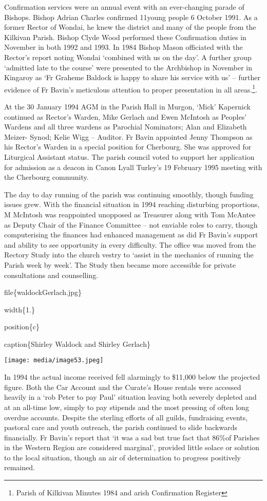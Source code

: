 Confirmation services were an annual event with an ever-changing parade of Bishops. Bishop Adrian Charles confirmed 11young people 6 October 1991. As a former Rector of Wondai, he knew the district and many of the people from the Kilkivan Parish. Bishop Clyde Wood performed these Confirmation duties in November in both 1992 and 1993. In 1984 Bishop Mason officiated with the Rector's report noting Wondai `combined with us on the day'. A further group `admitted late to the course' were presented to the Archbishop in November in Kingaroy as `Fr Graheme Baldock is happy to share his service with us' -- further evidence of Fr Bavin's meticulous attention to proper presentation in all areas.\footnote{Parish of Kilkivan Minutes 1984 and arish Confirmation Register}.

At the 30 January 1994 AGM in the Parish Hall in Murgon, `Mick' Kapernick continued as Rector's Warden, Mike Gerlach and Ewen McIntosh as Peoples' Wardens and all three wardens as Parochial Nominators; Alan and Elizabeth Meizer- Synod; Kelie Wigg -- Auditor. Fr Bavin appointed Jenny Thompson as his Rector's Warden in a special position for Cherbourg. She was approved for Liturgical Assistant status. The parish council voted to support her application for admission as a deacon in Canon Lyall Turley's 19 February 1995 meeting with the Cherbourg community.

The day to day running of the parish was continuing smoothly, though funding issues grew. With the financial situation in 1994 reaching disturbing proportions, M McIntosh was reappointed unopposed as Treasurer along with Tom McAntee as Deputy Chair of the Finance Committee -- not enviable roles to carry, though computerising the finances had enhanced management as did Fr Bavin's support and ability to see opportunity in every difficulty. The office was moved from the Rectory Study into the church vestry to `assist in the mechanics of running the Parish week by week'. The Study then became more accessible for private consultations and counselling.

file\{waldockGerlach.jpg\}

width\{1.\}

position\{c\}

caption\{Shirley Waldock and Shirley Gerlach\}

\texttt{[image: media/image53.jpeg]}

In 1994 the actual income received fell alarmingly to \$11,000 below the projected figure. Both the Car Account and the Curate's House rentals were accessed heavily in a `rob Peter to pay Paul' situation leaving both severely depleted and at an all-time low, simply to pay stipends and the most pressing of often long overdue accounts. Despite the sterling efforts of all guilds, fundraising events, pastoral care and youth outreach, the parish continued to slide backwards financially. Fr Bavin's report that `it was a sad but true fact that 86\%of Parishes in the Western Region are considered marginal', provided little solace or solution to the local situation, though an air of determination to progress positively remained.

